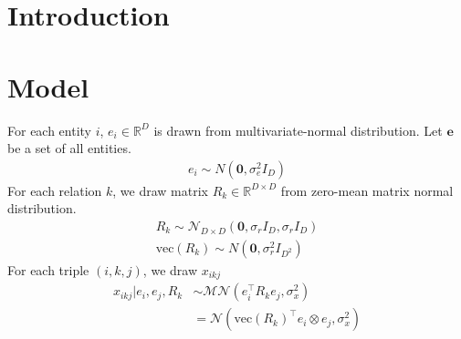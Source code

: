 \documentclass{article}
\begin{document}
 


\begin{abstract} 
\end{abstract} 

\section{Introduction}


\section{Model}

For each entity $i$, $e_i \in \mathbb{R}^{D}$ is drawn from multivariate-normal distribution. Let $\mathbf{e}$ be a set of all entities.
\begin{align}
e_i \sim {N}(\mathbf{0}, \sigma_e^2{I}_D)
\end{align}
For each relation $k$, we draw matrix $R_k \in \mathbb{R}^{D\times D}$ from zero-mean matrix normal distribution.
\begin{align}
R_k \sim \mathcal{N}_{D \times D}(\mathbf{0}, \sigma_r{I}_D, \sigma_r{I}_D) \\
\text{vec}(R_k) \sim N(\mathbf{0}, \sigma_r^2 I_{D^2})
\end{align}
For each triple $(i,k,j)$, we draw $x_{ikj}$ 
\begin{align}
x_{ikj} |e_i, e_j, R_k &\sim \mathcal{MN}(e_i^{\top} R_k e_j, \sigma_x^2)\\
& = \mathcal{N}(\text{vec}(R_k)^{\top} e_i \otimes e_j, \sigma_x^2)
\end{align}
\end{document}

